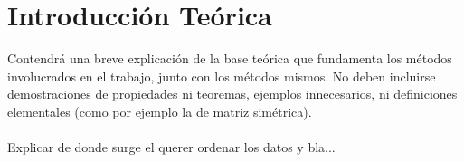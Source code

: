 \documentclass[a4paper]{article}
\begin{document}
\thispagestyle{empty}

\maketitle
\newpage

\thispagestyle{empty}
\vfill
\begin{abstract}
El resumen de no m\'as de 200 palabras, deber\'a explicar brevemente el trabajo realizado y las conclusiones de los auores de manera que pueda ser \'util por s\'i solo para dar una idea del contenido del trabajo. \\
\\
\\
\indent \indent \textbf{Palabras claves} \\
\\
Las palabras claves, no m\'as de cuatro, deben ser t\'erminos t\'ecnicos que den una idea del contenido del trabajo para facilitar su b\'usqueda en una base de datos tem\'atica. \\
$\clubsuit$ Wachi \\
$\clubsuit$ turroh \\
\end{abstract}

\thispagestyle{empty}
\vspace{3cm}
\tableofcontents
\newpage


\newpage

\section{Introducci\'on Te\'orica}

Contendr\'a una breve explicaci\'on de la base te\'orica que fundamenta los m\'etodos involucrados
en el trabajo, junto con los m\'etodos mismos. No deben incluirse demostraciones
de propiedades ni teoremas, ejemplos innecesarios, ni definiciones elementales (como
por ejemplo la de matriz sim\'etrica). \\
\\
Explicar de donde surge el querer ordenar los datos y bla... \\
\\
\end{document}
